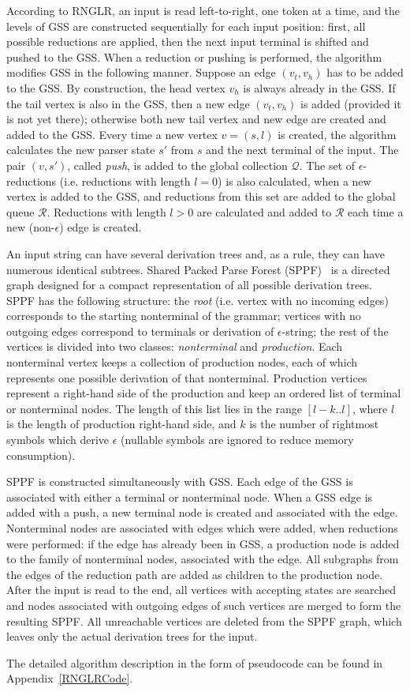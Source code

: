 According to RNGLR, an input is read left-to-right, one token at a time, and 
the levels of GSS are constructed sequentially for each input position: first, all  
possible reductions are applied, then the next input terminal is shifted and
pushed to the GSS. When a reduction or pushing is performed, 
the algorithm modifies GSS in the following manner. Suppose an 
edge $(v_t,v_h)$ has to be added to the GSS. By construction, the head vertex
$v_h$ is always already in the GSS. If the tail vertex is also in the GSS, then
a new edge $(v_t,v_h)$ is added (provided it is not yet there); otherwise both 
new tail vertex and new edge are created and added to the GSS. Every time a new 
vertex $v=(s,l)$ is created, the algorithm calculates the new parser 
state $s'$ from $s$ and the next terminal of the input. The pair $(v,s')$, called 
\emph{push}, is added to the global collection $\mathcal{Q}$. The set of $\epsilon$-reductions (i.e. reductions with length $l=0$) 
is also calculated, when a new vertex is added to the GSS, and reductions from this set are added to the 
global queue $\mathcal{R}$. Reductions with length $l>0$ are calculated and added to $\mathcal{R}$ 
each time a new (non-$\epsilon$) edge is created. 

An input string can have several derivation trees and, as a rule, they can have 
numerous identical subtrees. Shared Packed Parse Forest (SPPF)~\cite{SPPF} is a directed graph
designed for a compact representation of all possible derivation trees.  
SPPF has the following structure: the \emph{root} (i.e. vertex with no incoming edges) corresponds 
to the starting nonterminal of the grammar; vertices with no outgoing edges correspond to terminals 
or derivation of $\epsilon$-string; the rest of the vertices is divided into two classes: \emph{nonterminal} 
and \emph{production}. Each nonterminal vertex keeps a collection of production nodes, each of which represents one  
possible derivation of that nonterminal. Production vertices represent a right-hand side of the 
production and keep an ordered list of terminal or nonterminal nodes. The length of this list lies
in the range $[l-k..l]$, where $l$ is the length of production right-hand side, and $k$ is 
the number of rightmost symbols which derive $\epsilon$ (nullable symbols are ignored to reduce memory consumption).

SPPF is constructed simultaneously with GSS. Each edge of the GSS is associated with either 
a terminal or nonterminal node. When a GSS edge is added with a push, 
a new terminal node is created and associated with the edge. Nonterminal nodes are associated
with edges which were added, when reductions were performed: if the edge has already been in GSS, 
a production node is added to the family of nonterminal nodes, associated with the edge. All subgraphs 
from the edges of the reduction path are added as children to the production node. After the input 
is read to the end, all vertices with accepting states are searched and nodes associated with 
outgoing edges of such vertices are merged to form the resulting SPPF. All unreachable vertices 
are deleted from the SPPF graph, which leaves only the actual derivation trees for the input.

The detailed algorithm description in the form of pseudocode can be found in Appendix~\ref{RNGLRCode}.
